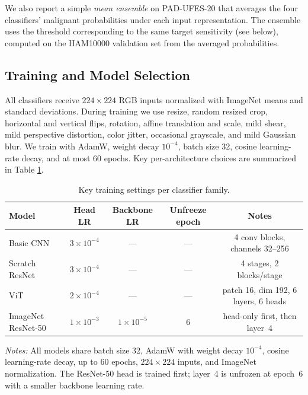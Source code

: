 \documentclass[10pt]{article}
\begin{document}
We also report a simple \emph{mean ensemble} on PAD-UFES-20 that averages the four classifiers' malignant probabilities under each input representation. The ensemble uses the threshold corresponding to the same target sensitivity (see below), computed on the HAM10000 validation set from the averaged probabilities.

\subsection{Training and Model Selection}

All classifiers receive $224\times224$ RGB inputs normalized with ImageNet means and standard deviations. During training we use resize, random resized crop, horizontal and vertical flips, rotation, affine translation and scale, mild shear, mild perspective distortion, color jitter, occasional grayscale, and mild Gaussian blur. We train with AdamW, weight decay $10^{-4}$, batch size 32, cosine learning-rate decay, and at most 60 epochs. Key per-architecture choices are summarized in Table \ref{tab:hparams}.

\begin{table}[t]
    \centering
    \begin{threeparttable}
    \caption{Key training settings per classifier family.}
    \label{tab:hparams}
    \small
    \begin{tabular}{lcccc}
        \toprule
        Model & Head LR & Backbone LR & Unfreeze epoch & Notes \\
        \midrule
        Basic CNN & $3\times10^{-4}$ & --- & --- & 4 conv blocks, channels 32--256 \\
        Scratch ResNet & $3\times10^{-4}$ & --- & --- & 4 stages, 2 blocks/stage \\
        ViT & $2\times10^{-4}$ & --- & --- & patch 16, dim 192, 6 layers, 6 heads \\
        ImageNet ResNet-50 & $1\times10^{-3}$ & $1\times10^{-5}$ & 6 & head-only first, then layer~4 \\
        \bottomrule
    \end{tabular}
    \begin{tablenotes}[para]
        \footnotesize
        \item \emph{Notes:} All models share batch size 32, AdamW with weight decay $10^{-4}$, cosine learning-rate decay, up to 60 epochs, $224\times224$ inputs, and ImageNet normalization. The ResNet-50 head is trained first; layer~4 is unfrozen at epoch~6 with a smaller backbone learning rate.
    \end{tablenotes}
    \end{threeparttable}
\end{table}
\end{document}
